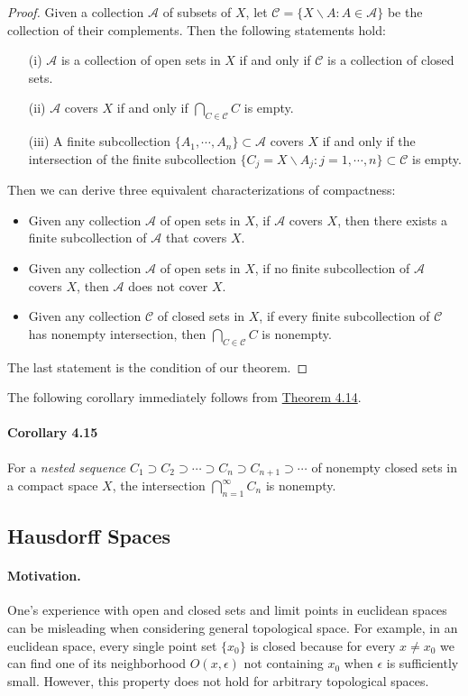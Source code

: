 \documentclass{article}
\numberwithin{equation}{section}
\theoremstyle{plain}
\theoremstyle{definition}
\begin{document}
\begin{proof}
Given a collection $\mathscr{A}$ of subsets of $X$, let $\mathscr{C}=\{X\backslash A:A\in\mathscr{A}\}$ be the collection of their complements. Then the following statements hold:
\begin{itemize}
	\item[(i)] $\mathscr{A}$ is a collection of open sets in $X$ if and only if $\mathscr{C}$ is a collection of closed sets.
	\item[(ii)] $\mathscr{A}$ covers $X$ if and only if $\bigcap_{C\in\mathscr{C}} C$ is empty.
	\item[(iii)] A finite subcollection $\{A_1,\cdots,A_n\}\subset\mathscr{A}$ covers $X$ if and only if the intersection of the finite subcollection $\{C_j=X\backslash A_j:j=1,\cdots,n\}\subset\mathscr{C}$ is empty.
\end{itemize}
Then we can derive three equivalent characterizations of compactness:
\begin{itemize}
	\item Given any collection $\mathscr{A}$ of open sets in $X$, if $\mathscr{A}$ covers $X$, then there exists a finite subcollection of $\mathscr{A}$ that covers $X$.
	\item Given any collection $\mathscr{A}$ of open sets in $X$, if no finite subcollection of $\mathscr{A}$ covers $X$, then $\mathscr{A}$ does not cover $X$.
	\item Given any collection $\mathscr{C}$ of closed sets in $X$, if every finite subcollection of $\mathscr{C}$ has nonempty intersection, then $\bigcap_{C\in\mathscr{C}}C$ is nonempty.
\end{itemize}
The last statement is the condition of our theorem.
\end{proof}

The following corollary immediately follows from \hyperref[thm:4.14]{Theorem 4.14}.
\paragraph{Corollary 4.15\label{cor:4.15}} For a \textit{nested sequence} $C_1\supset C_2 \supset \cdots \supset C_n \supset C_{n+1} \supset\cdots$ of nonempty closed sets in a compact space $X$, the intersection $\bigcap_{n=1}^\infty C_n$ is nonempty.

\subsection{Hausdorff Spaces}
\paragraph{Motivation.} One’s experience with open and closed sets and limit points in euclidean spaces can be misleading when considering general topological space. For example, in an euclidean space, every single point set $\{x_0\}$ is closed because for every $x\neq x_0$ we can find one of its neighborhood $O(x,\epsilon)$ not containing $x_0$ when $\epsilon$ is sufficiently small. However, this property does not hold for arbitrary topological spaces.
\end{document}
